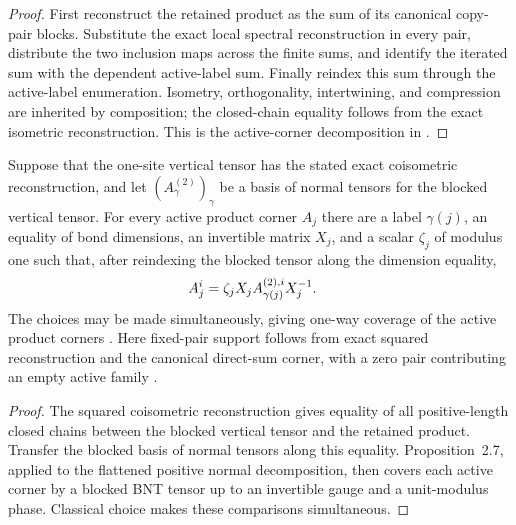 \begin{proof}\leanok
    First reconstruct the retained product as the sum of its canonical
    copy-pair blocks. Substitute the exact local spectral reconstruction in
    every pair, distribute the two inclusion maps across the finite sums, and
    identify the iterated sum with the dependent active-label sum. Finally
    reindex this sum through the active-label enumeration. Isometry,
    orthogonality, intertwining, and compression are inherited by composition;
    the closed-chain equality follows from the exact isometric reconstruction.
    This is the active-corner decomposition in
    \cite[Appendix~C.4, lines~2020--2029]{Cirac2016MPDO_arXiv}.
\end{proof}

\begin{lemma}
    \label{thm:mpdo_active_product_corner_blocked_bnt_coverage}
    \leanok
    Suppose that the one-site vertical tensor has the stated exact
    coisometric reconstruction, and let $(A^{(2)}_\gamma)_\gamma$ be a basis
    of normal tensors for the blocked vertical tensor. For every active
    product corner $A_j$ there are a label $\gamma(j)$, an equality of bond
    dimensions, an invertible matrix $X_j$, and a scalar $\zeta_j$ of modulus
    one such that, after reindexing the blocked tensor along the dimension
    equality,
    \begin{align}
        A_j^i
         & =\zeta_jX_jA^{(2),i}_{\gamma(j)}X_j^{-1}.
        \notag
    \end{align}
    The choices may be made simultaneously, giving one-way coverage of the
    active product corners \cite{gap:cpsv16_bnt_uniqueness_zero_coefficient}.
    Here fixed-pair support follows from exact squared reconstruction and the
    canonical direct-sum corner, with a zero pair contributing an empty active
    family \cite{gap:cpsv16_figure11_per_pair_support}.
\end{lemma}

\begin{proof}\leanok
    The squared coisometric reconstruction gives equality of all
    positive-length closed chains between the blocked vertical tensor and the
    retained product. Transfer the blocked basis of normal tensors along
    this equality. Proposition~2.7, applied to the flattened positive normal
    decomposition, then covers each active corner by a blocked BNT tensor up
    to an invertible gauge and a unit-modulus phase. Classical choice makes
    these comparisons simultaneous.
\end{proof}

